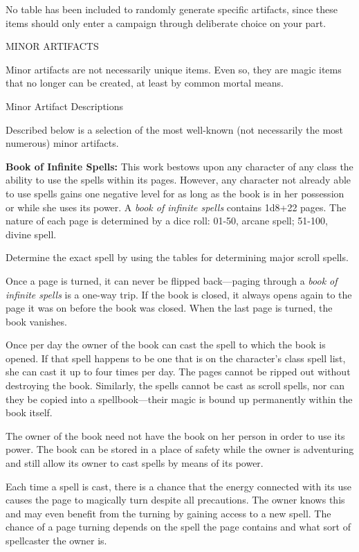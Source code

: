 \documentclass{article}
\begin{document}
No table has been included to randomly generate specific artifacts, since these 
items should only enter a campaign through deliberate choice on your part.

\vspace{12pt}
MINOR ARTIFACTS

Minor artifacts are not necessarily unique items. Even so, they are magic items 
that no longer can be created, at least by common mortal means.

\vspace{12pt}
Minor Artifact Descriptions

Described below is a selection of the most well-known (not necessarily the most 
numerous) minor artifacts.

\vspace{12pt}
\textbf{Book of Infinite Spells:} This work bestows upon any character of any class 
the ability to use the spells within its pages. However, any character not already 
able to use spells gains one negative level for as long as the book is in her possession 
or while she uses its power. A \textit{book of infinite spells }contains 1d8+22 
pages. The nature of each page is determined by a dice roll: 01-50, arcane spell; 
51-100, divine spell.

Determine the exact spell by using the tables for determining major scroll spells.

Once a page is turned, it can never be flipped back---paging through a \textit{book 
of infinite spells }is a one-way trip. If the book is closed, it always opens again 
to the page it was on before the book was closed. When the last page is turned, 
the book vanishes.

Once per day the owner of the book can cast the spell to which the book is opened. 
If that spell happens to be one that is on the character's class spell list, she 
can cast it up to four times per day. The pages cannot be ripped out without destroying 
the book. Similarly, the spells cannot be cast as scroll spells, nor can they be 
copied into a spellbook---their magic is bound up permanently within the book itself.

The owner of the book need not have the book on her person in order to use its 
power. The book can be stored in a place of safety while the owner is adventuring 
and still allow its owner to cast spells by means of its power.

Each time a spell is cast, there is a chance that the energy connected with its 
use causes the page to magically turn despite all precautions. The owner knows 
this and may even benefit from the turning by gaining access to a new spell. The 
chance of a page turning depends on the spell the page contains and what sort of 
spellcaster the owner is.
\end{document}
